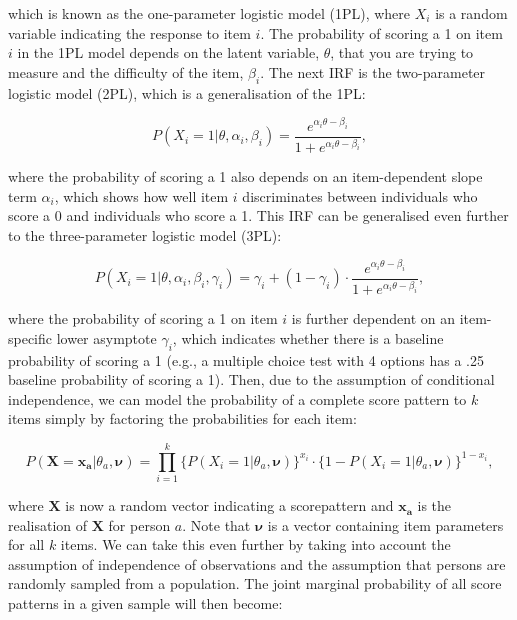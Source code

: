 \documentclass[Royal,sageapa,times,doublespace]{sagej}
\begin{document}
which is known as the one-parameter logistic model (1PL), where $X_i$ is a random variable indicating the response to item $i$. The probability of scoring a 1 on item $i$ in the 1PL model depends on the latent variable, $\theta$, that you are trying to measure and the difficulty of the item, $\beta_i$. The next IRF is the two-parameter logistic model (2PL), which is a generalisation of the 1PL:

\begin{equation}
P(X_i = 1 | \theta, \alpha_{i}, \beta_{i}) = \frac{e^{\alpha_{i}\theta - \beta_{i}}}{1 + e^{\alpha_{i}\theta - \beta_{i}}},
\end{equation}

where the probability of scoring a 1 also depends on an item-dependent slope term $\alpha_i$, which shows how well item $i$ discriminates between individuals who score a 0 and individuals who score a 1. This IRF can be generalised even further to the three-parameter logistic model (3PL):

\begin{equation}
P(X_i = 1 | \theta, \alpha_{i}, \beta_{i}, \gamma_{i}) = \gamma_{i} + (1 - \gamma_{i}) \cdot 
\frac{e^{\alpha_{i}\theta - \beta_{i}}}{1 + e^{\alpha_{i}\theta - \beta_{i}}},
\end{equation}

where the probability of scoring a 1 on item $i$ is further dependent on an item-specific lower asymptote $\gamma_i$, which indicates whether there is
a baseline probability of scoring a 1 (e.g., a multiple choice test with 4 options has a .25 baseline probability of scoring a 1). Then, due to the assumption of conditional independence, we can model the probability of a complete score pattern to $k$ items simply by factoring the probabilities for each item:

\begin{equation}
P(\boldsymbol{X} = \boldsymbol{x_a} | \theta_a, \boldsymbol{\nu}) = \prod_{i=1}^{k} \{P(X_i = 1 | \theta_a, \boldsymbol{\nu})\}^{x_i} \cdot  \{1 - P(X_i = 1 | \theta_a, \boldsymbol{\nu}) \}^{1 - x_i},
\end{equation}

where $\boldsymbol{X}$ is now a random vector indicating a scorepattern and $\boldsymbol{x_a}$ is the realisation of $\boldsymbol{X}$ for person $a$. Note that $\boldsymbol{\nu}$ is a vector containing item parameters for all $k$ items. We can take this even further by taking into account the assumption of independence of observations and the assumption that persons are randomly sampled from a population. The joint marginal probability of all score patterns in a given sample will then become:
\end{document}
